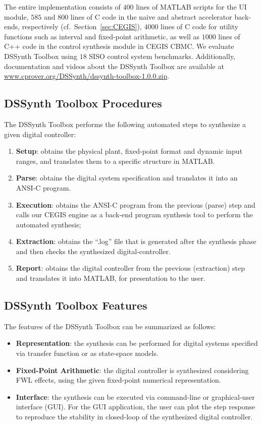 \documentclass[10pt,conference]{IEEEtran}
\newcommand\tool{{DSSynth Toolbox}\xspace}
\begin{document}
The entire implementation consists of $400$ lines of MATLAB scripts for the
UI module, $585$ and $800$ lines of C code in the naive and abstract
accelerator back-ends, respectively (cf.~Section~\ref{sec:CEGIS}), $4000$
lines of C code for utility functions such as interval and fixed-point
arithmetic, as well as $1000$ lines of C++ code in the control synthesis
module in CEGIS CBMC.  We evaluate \tool using $18$ SISO control system
benchmarks.  Additionally, documentation and videos about the \tool are
available at \url{www.cprover.org/DSSynth/dssynth-toolbox-1.0.0.zip}.


\subsection{\tool Procedures}

The \tool performs the following automated steps
to synthesize a given digital controller:
%
\begin{enumerate}
%
\item \textbf{Setup}: obtains the physical plant, fixed-point format and
dynamic input ranges, and translates them to a specific structure in MATLAB.
%
\item \textbf{Parse}: obtains the digital system specification and translates 
it into an ANSI-C program.
%
\item \textbf{Execution}: obtains the ANSI-C program from the previous
(parse) step and calls our CEGIS engine as a back-end program synthesis tool
to perform the automated synthesis;
%
\item \textbf{Extraction}: obtains the ``.log'' file that is generated 
after the synthesis phase and then checks the synthesized digital-controller.
%
\item \textbf{Report}: obtains the digital controller from the previous
(extraction) step and translates it into MATLAB, for presentation to the
user.
%
\end{enumerate}

\subsection{\tool Features}

The features of the \tool can be summarized as follows:
%
\begin{itemize}
%
\item \textbf{Representation}: the synthesis can be 
performed for digital systems specified via 
transfer function or as state-space models.
%
\item \textbf{Fixed-Point Arithmetic}: the digital 
controller is synthesized considering FWL effects, 
using the given fixed-point numerical representation.
%
\item \textbf{Interface}: the synthesis can be executed via command-line or
graphical-user interface (GUI).  For the GUI application, the user can plot
the step response to reproduce the stability in closed-loop of the
synthesized digital controller.
%
\end{itemize}
\end{document}
